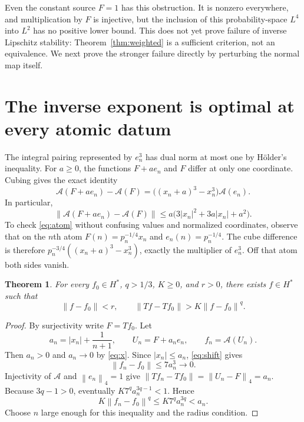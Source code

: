 \documentclass[11pt]{article}
\newtheorem{theorem}{Theorem}[section]
\theoremstyle{remark}\newtheorem{remark}[theorem]{Remark}
\newcommand{\norm}[1]{\left\lVert#1\right\rVert}
\newcommand{\A}{\mathcal A}
\begin{document}
Even the constant source $F=1$ has this obstruction. It is nonzero
everywhere, and multiplication by $F$ is injective, but the inclusion
of this probability-space $L^4$ into $L^2$ has no positive lower bound.
This does not yet prove failure of inverse Lipschitz stability:
Theorem~\ref{thm:weighted} is a sufficient criterion, not an equivalence.
We next prove the stronger failure directly by perturbing the normal
map itself.

\section{The inverse exponent is optimal at every atomic datum}
The integral pairing represented by $e_n^3$ has dual norm at most one
by H\"older's inequality. For $a\geq0$, the functions $F+ae_n$ and
$F$ differ at only one coordinate. Cubing gives the exact identity
\begin{equation}\label{eq:atom}
 \A(F+ae_n)-\A(F)
 =\big((x_n+a)^3-x_n^3\big)\A(e_n).
\end{equation}
In particular,
\begin{equation}\label{eq:shift}
 \norm{\A(F+ae_n)-\A(F)}
 \leq a\big(3|x_n|^2+3a|x_n|+a^2\big).
\end{equation}
To check \eqref{eq:atom} without confusing values and normalized
coordinates, observe that on the $n$th atom
$F(n)=p_n^{-1/4}x_n$ and $e_n(n)=p_n^{-1/4}$.
The cube difference is therefore $p_n^{-3/4}((x_n+a)^3-x_n^3)$,
exactly the multiplier of $e_n^3$. Off that atom both sides vanish.

\begin{theorem}\label{thm:everywhere}
For every $f_0\in H^*$, $q>1/3$, $K\geq0$, and $r>0$, there exists
$f\in H^*$ such that
\begin{equation}\label{eq:everywhere}
 \norm{f-f_0}<r,\qquad
 \norm{Tf-Tf_0}>K\norm{f-f_0}^q.
\end{equation}
\end{theorem}
\begin{proof}
By surjectivity write $F=Tf_0$. Let
\[
 a_n=|x_n|+\frac1{n+1},\qquad U_n=F+a_ne_n,\qquad f_n=\A(U_n).
\]
Then $a_n>0$ and $a_n\to0$ by \eqref{eq:x}. Since $|x_n|\leq a_n$,
\eqref{eq:shift} gives
\[
 \norm{f_n-f_0}\leq7a_n^3\longrightarrow0.
\]
Injectivity of $\A$ and $\norm{e_n}_4=1$ give
$\norm{Tf_n-Tf_0}=\norm{U_n-F}_4=a_n$.
Because $3q-1>0$, eventually
$K7^q a_n^{3q-1}<1$. Hence
\[
 K\norm{f_n-f_0}^q\leq K7^q a_n^{3q}<a_n.
\]
Choose $n$ large enough for this inequality and the radius condition.
\end{proof}
\end{document}
